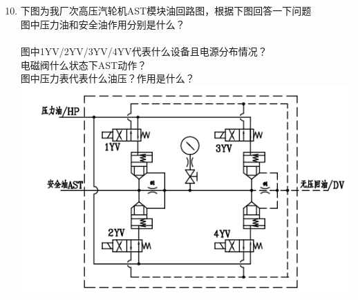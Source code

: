 \documentclass{book}
\begin{document}
\section{}
\begin{enumerate}
	\setcounter{enumi}{9}
	\item 下图为我厂次高压汽轮机AST模块油回路图，根据下图回答一下问题
\\图中压力油和安全油作用分别是什么？
\\
\\图中1YV/2YV/3YV/4YV代表什么设备且电源分布情况？
\\
电磁阀什么状态下AST动作？
\\
图中压力表代表什么油压？作用是什么？
\\
\includegraphics[angle=0,width=500pt,trim=0 0 0 0,clip]{picture/AST.png}%

\end{enumerate}
\end{document}
